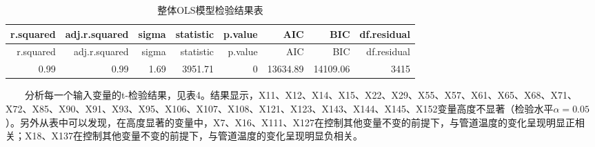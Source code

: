\documentclass[
]{article}
\begin{document}
\begin{longtable}[]{@{}rrrrrrrr@{}}
\caption{整体OLS模型检验结果表}\tabularnewline
\toprule
r.squared & adj.r.squared & sigma & statistic & p.value & AIC & BIC &
df.residual\tabularnewline
\midrule
\endfirsthead
\toprule
r.squared & adj.r.squared & sigma & statistic & p.value & AIC & BIC &
df.residual\tabularnewline
\midrule
\endhead
0.99 & 0.99 & 1.69 & 3951.71 & 0 & 13634.89 & 14109.06 &
3415\tabularnewline
\bottomrule
\end{longtable}

  分析每一个输入变量的t-检验结果，见表4。结果显示，X11、X12、X14、X15、X22、X29、X55、X57、X61、X65、X68、X71、X72、X85、X90、X91、X93、X95、X106、X107、X108、X121、X123、X143、X144、X145、X152变量高度不显著（检验水平\(\alpha=0.05\)）。另外从表中可以发现，在高度显著的变量中，X7、X16、X111、X127在控制其他变量不变的前提下，与管道温度的变化呈现明显正相关；X18、X137在控制其他变量不变的前提下，与管道温度的变化呈现明显负相关。
\end{document}
